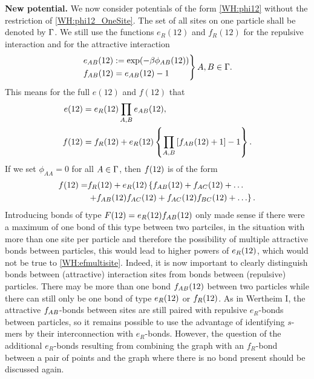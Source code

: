 \documentclass[8.5pt,twoside,twocolumn]{article}
\newcommand\AB{\enmat{{AB}}}
\newcommand\ot{\enmat{(12)}}
\theoremstyle{standard}
\begin{document}
\textbf{New potential.} We now consider potentials of the form \eqref{WH:phi12} without the restriction of
\eqref{WH:phi12_OneSite}. The set of all sites on one particle shall be denoted
by $\Gamma$. We still use the functions $e_R(12)$ and $f_R(12)$ for the repulsive
interaction and for the attractive interaction
\begin{equation}
\begin{rcases}
e_{\AB}(12):=\exp(-\be\phi_\AB(12)) \\
f_\AB(12)=e_\AB(12)-1
\end{rcases}
A,B \in \Ga.
\label{WH:eABfAB}
\end{equation} 
This means for the full $e(12)$ and $f(12)$ that
\begin{equation}
\begin{aligned}
e(12)&=e_R(12)\prod_{A,B}e_\AB(12), \\
f(12) %
&=f_R(12)+e_R(12)\lt\{\prod_{A,B} \lt[f_\AB(12) + 1\rt] - 1 \rt\}. %
\end{aligned}
\label{WH:efmultisite}
\end{equation}
If we set $\phi_{AA}=0$ for all $A\in\Gamma$, then $f\ot$ is of the form
\begin{equation}
\begin{aligned}
f(12)=&f_R\ot+e_R\ot\lt\{f_\AB\ot+f_{AC}\ot+\ldots\rt.\\
&\lt.+f_{AB}\ot f_{AC}\ot+f_{AC}\ot f_{BC}\ot+\ldots \rt\}.
\end{aligned}
\label{WH:fexample}
\end{equation}
Introducing bonds of type $F\ot=e_R\ot f_\AB\ot$ only made sense if there were a maximum of one
bond of this type between two partciles, in the situation with more than one site per
particle and therefore the possibility of multiple attractive bonds between particles,
this would lead to higher powers of $e_R\ot$, which would not be true to \eqref{WH:efmultisite}.
Indeed, it is now important to clearly distinguish bonds between (attractive) interaction sites
from bonds between (repulsive) particles. There may be more than one bond $f_\AB\ot$
between two particles while there can still only be one bond of type $e_R\ot$ or $f_R\ot$.  
As in Wertheim I, the attractive $f_\AB$-bonds between sites are still paired with repulsive
$e_R$-bonds between particles, so it remains possible to use the 
advantage of identifying $s$-mers by their interconnection with $e_R$-bonds. However,
the question of the additional $e_R$-bonds resulting from combining the graph with an
$f_R$-bond between a pair of points and the graph where there is no bond present
should be discussed again. 
\end{document}
